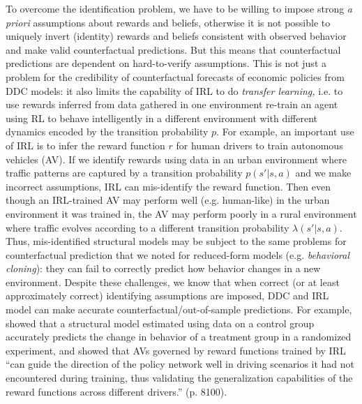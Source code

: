 To overcome the identification problem, we have to be willing
to impose strong {\it a priori\/} assumptions about rewards and beliefs, otherwise it is not possible to uniquely invert (identity) rewards and beliefs
consistent with observed behavior and make valid counterfactual predictions. But this means that counterfactual predictions are
dependent on hard-to-verify assumptions. This is not just a problem for the credibility of counterfactual forecasts of economic
policies from DDC models: it also limits the capability of IRL to do {\it transfer learning,\/} i.e. to use rewards inferred from data gathered in
one environment re-train an agent using RL to behave intelligently in a different environment with different dynamics encoded by the transition
probability $p$. For example, an important use of IRL is to infer the reward
function $r$ for human drivers to train autonomous vehicles (AV). If we identify rewards using data in an urban environment where traffic patterns are captured by a
transition probability $p(s'|s,a)$ and we make incorrect assumptions, IRL can mis-identify the reward function. Then even though an IRL-trained AV may perform
well (e.g. human-like) in the urban environment it was trained in, the AV may perform poorly in a rural environment where
traffic evolves according to a different transition probability $\lambda(s'|s,a)$. Thus, mis-identified structural models may be subject to the same
problems  for counterfactual prediction that we noted for reduced-form models (e.g. {\it behavioral cloning\/}): they can fail to correctly predict
how behavior changes in a new environment.
Despite these challenges, we know that when correct (or at least approximately correct) identifying assumptions are
imposed, DDC and IRL model can make accurate counterfactual/out-of-sample predictions. For example, \citet{toddwolpin:2006} showed that a
structural model estimated using data on a control group accurately predicts the change in behavior
of a treatment group in a randomized experiment, and \citet{zhuang:2024} showed that  AVs governed by reward functions trained by IRL
``can guide the direction of the policy network well in driving scenarios it had not encountered during training, thus validating the
generalization capabilities of the reward functions across different drivers.'' (p. 8100).

